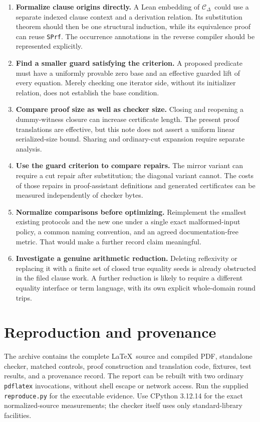 \documentclass[11pt]{article}
\theoremstyle{definition}\newtheorem{definition}[theorem]{Definition}
\theoremstyle{remark}\newtheorem{remark}[theorem]{Remark}
\newcommand{\Cd}{\ensuremath{\mathcal C_{\Delta}}}
\begin{document}
\begin{enumerate}
\item \textbf{Formalize clause origins directly.} A Lean embedding of \Cd\ could use a separate indexed clause context and a derivation relation. Its substitution theorem should then be one structural induction, while its equivalence proof can reuse \texttt{SPrf}. The occurrence annotations in the reverse compiler should be represented explicitly.
\item \textbf{Find a smaller guard satisfying the criterion.} A proposed predicate must have a uniformly provable zero base and an effective guarded lift of every equation. Merely checking one iterator side, without its initializer relation, does not establish the base condition.
\item \textbf{Compare proof size as well as checker size.} Closing and reopening a dummy-witness closure can increase certificate length. The present proof translations are effective, but this note does not assert a uniform linear serialized-size bound. Sharing and ordinary-cut expansion require separate analysis.
\item \textbf{Use the guard criterion to compare repairs.} The mirror variant can require a cut repair after substitution; the diagonal variant cannot. The costs of those repairs in proof-assistant definitions and generated certificates can be measured independently of checker bytes.
\item \textbf{Normalize comparisons before optimizing.} Reimplement the smallest existing protocols and the new one under a single exact malformed-input policy, a common naming convention, and an agreed documentation-free metric. That would make a further record claim meaningful.
\item \textbf{Investigate a genuine arithmetic reduction.} Deleting reflexivity or replacing it with a finite set of closed true equality seeds is already obstructed in the filed clause work. A further reduction is likely to require a different equality interface or term language, with its own explicit whole-domain round trips.
\end{enumerate}

\section*{Reproduction and provenance}

The archive contains the complete \LaTeX\ source and compiled PDF, standalone checker, matched controls, proof construction and translation code, fixtures, test results, and a provenance record. The report can be rebuilt with two ordinary \texttt{pdflatex} invocations, without shell escape or network access. Run the supplied \texttt{reproduce.py} for the executable evidence. Use CPython 3.12.14 for the exact normalized-source measurements; the checker itself uses only standard-library facilities.
\end{document}
